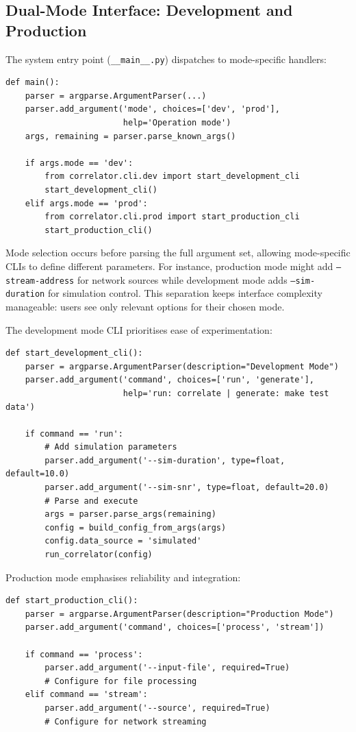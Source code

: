 \subsection{Dual-Mode Interface: Development and Production}

The system entry point (\texttt{\_\_main\_\_.py}) dispatches to mode-specific handlers:

\begin{verbatim}
def main():
    parser = argparse.ArgumentParser(...)
    parser.add_argument('mode', choices=['dev', 'prod'], 
                        help='Operation mode')
    args, remaining = parser.parse_known_args()
    
    if args.mode == 'dev':
        from correlator.cli.dev import start_development_cli
        start_development_cli()
    elif args.mode == 'prod':
        from correlator.cli.prod import start_production_cli
        start_production_cli()
\end{verbatim}

Mode selection occurs before parsing the full argument set, allowing mode-specific CLIs to define different parameters. For instance, production mode might add \texttt{--stream-address} for network sources while development mode adds \texttt{--sim-duration} for simulation control. This separation keeps interface complexity manageable: users see only relevant options for their chosen mode.

The development mode CLI prioritises ease of experimentation:

\begin{verbatim}
def start_development_cli():
    parser = argparse.ArgumentParser(description="Development Mode")
    parser.add_argument('command', choices=['run', 'generate'], 
                        help='run: correlate | generate: make test data')
    
    if command == 'run':
        # Add simulation parameters
        parser.add_argument('--sim-duration', type=float, default=10.0)
        parser.add_argument('--sim-snr', type=float, default=20.0)
        # Parse and execute
        args = parser.parse_args(remaining)
        config = build_config_from_args(args)
        config.data_source = 'simulated'
        run_correlator(config)
\end{verbatim}

Production mode emphasises reliability and integration:

\begin{verbatim}
def start_production_cli():
    parser = argparse.ArgumentParser(description="Production Mode")
    parser.add_argument('command', choices=['process', 'stream'])
    
    if command == 'process':
        parser.add_argument('--input-file', required=True)
        # Configure for file processing
    elif command == 'stream':
        parser.add_argument('--source', required=True)
        # Configure for network streaming
\end{verbatim}

